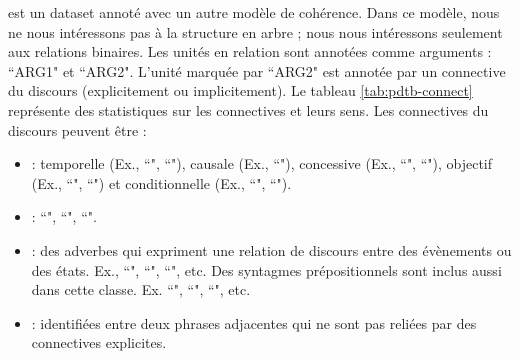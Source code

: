 \documentclass{KodeBook}
\begin{document}
 est un dataset annoté avec un autre modèle de cohérence. 
Dans ce modèle, nous ne nous intéressons pas à la structure en arbre ; nous nous intéressons seulement aux relations binaires. 
Les unités en relation sont annotées comme arguments : ``ARG1" et ``ARG2". 
L'unité marquée par ``ARG2" est annotée par un connective du discours (explicitement ou implicitement). 
Le tableau \ref{tab:pdtb-connect} représente des statistiques sur les connectives et leurs sens.
Les connectives du discours peuvent être :
\begin{itemize}
	\item {} :  
	temporelle (Ex., ``", ``"), 
	causale (Ex., ``"), 
	concessive (Ex., ``", ``"), 
	objectif (Ex., ``", ``") et 
	conditionnelle (Ex., ``", ``").
	
	\item {} : ``", ``", ``".
	
	\item {} : des adverbes qui expriment une relation de discours entre des évènements ou des états. Ex., ``", ``", ``", etc.
	Des syntagmes prépositionnels sont inclus aussi dans cette classe. Ex. ``",
		``", ``", etc.
	
	\item {} :  identifiées entre deux phrases adjacentes qui ne sont pas reliées par des connectives explicites.
\end{itemize}
\end{document}
